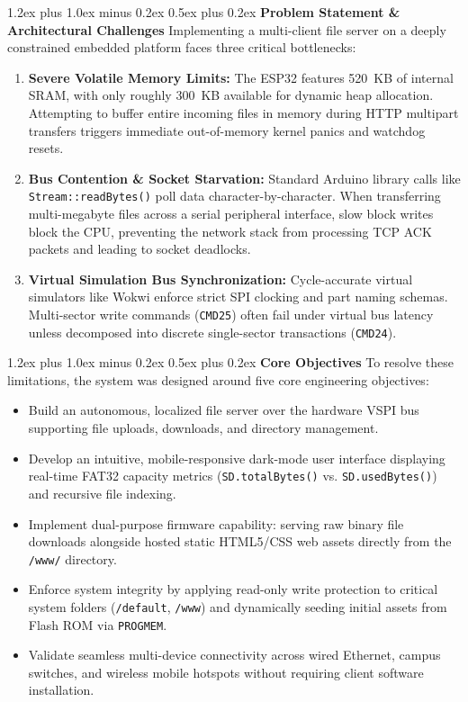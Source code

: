 ﻿\documentclass[conference]{IEEEtran}
\makeatletter
\renewcommand\subsection{\@startsection{subsection}{2}{\z@}%
  {1.2ex plus 1.0ex minus 0.2ex}%
  {0.5ex plus 0.2ex}%
  {\normalfont\normalsize\bfseries}}
\makeatother
\begin{document}
\subsection{\textbf{Problem Statement \& Architectural Challenges}}
Implementing a multi-client file server on a deeply constrained embedded platform faces three critical bottlenecks:
\begin{enumerate}
    \item \textbf{Severe Volatile Memory Limits:} The ESP32 features 520~KB of internal SRAM, with only roughly 300~KB available for dynamic heap allocation. Attempting to buffer entire incoming files in memory during HTTP multipart transfers triggers immediate out-of-memory kernel panics and watchdog resets.
    \item \textbf{Bus Contention \& Socket Starvation:} Standard Arduino library calls like \texttt{Stream::readBytes()} poll data character-by-character. When transferring multi-megabyte files across a serial peripheral interface, slow block writes block the CPU, preventing the network stack from processing TCP ACK packets and leading to socket deadlocks.
    \item \textbf{Virtual Simulation Bus Synchronization:} Cycle-accurate virtual simulators like Wokwi enforce strict SPI clocking and part naming schemas. Multi-sector write commands (\texttt{CMD25}) often fail under virtual bus latency unless decomposed into discrete single-sector transactions (\texttt{CMD24}).
\end{enumerate}

\subsection{\textbf{Core Objectives}}
To resolve these limitations, the system was designed around five core engineering objectives:
\begin{itemize}
    \item Build an autonomous, localized file server over the hardware VSPI bus supporting file uploads, downloads, and directory management.
    \item Develop an intuitive, mobile-responsive dark-mode user interface displaying real-time FAT32 capacity metrics (\texttt{SD.totalBytes()} vs. \texttt{SD.usedBytes()}) and recursive file indexing.
    \item Implement dual-purpose firmware capability: serving raw binary file downloads alongside hosted static HTML5/CSS web assets directly from the \texttt{/www/} directory.
    \item Enforce system integrity by applying read-only write protection to critical system folders (\texttt{/default}, \texttt{/www}) and dynamically seeding initial assets from Flash ROM via \texttt{PROGMEM}.
    \item Validate seamless multi-device connectivity across wired Ethernet, campus switches, and wireless mobile hotspots without requiring client software installation.
\end{itemize}
\end{document}
